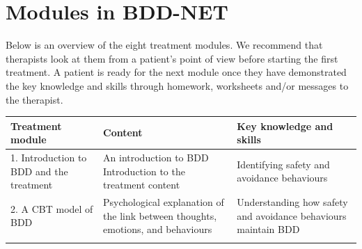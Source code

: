 \documentclass[]{book}
\begin{document}
\hypertarget{modules-in-bdd-net}{%
\section{Modules in BDD-NET}\label{modules-in-bdd-net}}

Below is an overview of the eight treatment modules. We recommend that therapists look at them from a patient's point of view before starting the first treatment. A patient is ready for the next module once they have demonstrated the key knowledge and skills through homework, worksheets and/or messages to the therapist.

\begin{longtable}[]{@{}lll@{}}
\toprule
\begin{minipage}[b]{0.33\columnwidth}\raggedright
\textbf{Treatment module}\strut
\end{minipage} & \begin{minipage}[b]{0.33\columnwidth}\raggedright
\textbf{Content}\strut
\end{minipage} & \begin{minipage}[b]{0.25\columnwidth}\raggedright
\textbf{Key knowledge and skills}\strut
\end{minipage}\tabularnewline
\midrule
\endhead
\begin{minipage}[t]{0.33\columnwidth}\raggedright
1. Introduction to BDD and the treatment\strut
\end{minipage} & \begin{minipage}[t]{0.33\columnwidth}\raggedright
An introduction to BDD Introduction to the treatment content\strut
\end{minipage} & \begin{minipage}[t]{0.25\columnwidth}\raggedright
Identifying safety and avoidance behaviours\strut
\end{minipage}\tabularnewline
\begin{minipage}[t]{0.33\columnwidth}\raggedright
2. A CBT model of BDD\strut
\end{minipage} & \begin{minipage}[t]{0.33\columnwidth}\raggedright
Psychological explanation of the link between thoughts, emotions, and behaviours\strut
\end{minipage} & \begin{minipage}[t]{0.25\columnwidth}\raggedright
Understanding how safety and avoidance behaviours maintain BDD\strut
\end{minipage}\tabularnewline
\begin{minipage}[t]{0.33\columnwidth}\raggedright

\end{minipage}
\end{longtable}
\end{document}
